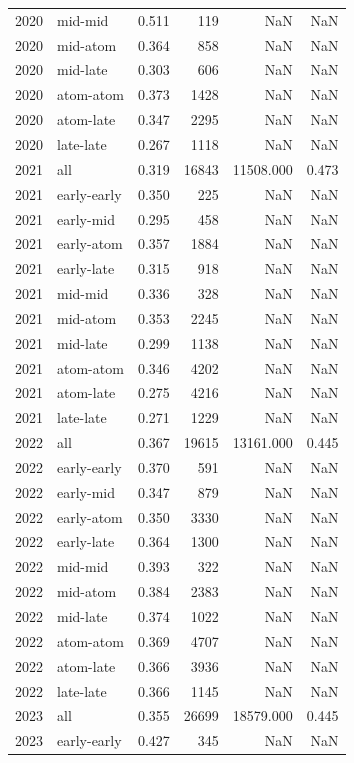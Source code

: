 \begin{table}
\begin{tabular}{rlrrrr}
2020 & mid-mid & 0.511 & 119 & NaN & NaN \\
2020 & mid-atom & 0.364 & 858 & NaN & NaN \\
2020 & mid-late & 0.303 & 606 & NaN & NaN \\
2020 & atom-atom & 0.373 & 1428 & NaN & NaN \\
2020 & atom-late & 0.347 & 2295 & NaN & NaN \\
2020 & late-late & 0.267 & 1118 & NaN & NaN \\
2021 & all & 0.319 & 16843 & 11508.000 & 0.473 \\
2021 & early-early & 0.350 & 225 & NaN & NaN \\
2021 & early-mid & 0.295 & 458 & NaN & NaN \\
2021 & early-atom & 0.357 & 1884 & NaN & NaN \\
2021 & early-late & 0.315 & 918 & NaN & NaN \\
2021 & mid-mid & 0.336 & 328 & NaN & NaN \\
2021 & mid-atom & 0.353 & 2245 & NaN & NaN \\
2021 & mid-late & 0.299 & 1138 & NaN & NaN \\
2021 & atom-atom & 0.346 & 4202 & NaN & NaN \\
2021 & atom-late & 0.275 & 4216 & NaN & NaN \\
2021 & late-late & 0.271 & 1229 & NaN & NaN \\
2022 & all & 0.367 & 19615 & 13161.000 & 0.445 \\
2022 & early-early & 0.370 & 591 & NaN & NaN \\
2022 & early-mid & 0.347 & 879 & NaN & NaN \\
2022 & early-atom & 0.350 & 3330 & NaN & NaN \\
2022 & early-late & 0.364 & 1300 & NaN & NaN \\
2022 & mid-mid & 0.393 & 322 & NaN & NaN \\
2022 & mid-atom & 0.384 & 2383 & NaN & NaN \\
2022 & mid-late & 0.374 & 1022 & NaN & NaN \\
2022 & atom-atom & 0.369 & 4707 & NaN & NaN \\
2022 & atom-late & 0.366 & 3936 & NaN & NaN \\
2022 & late-late & 0.366 & 1145 & NaN & NaN \\
2023 & all & 0.355 & 26699 & 18579.000 & 0.445 \\
2023 & early-early & 0.427 & 345 & NaN & NaN \\

\end{tabular}
\end{table}
